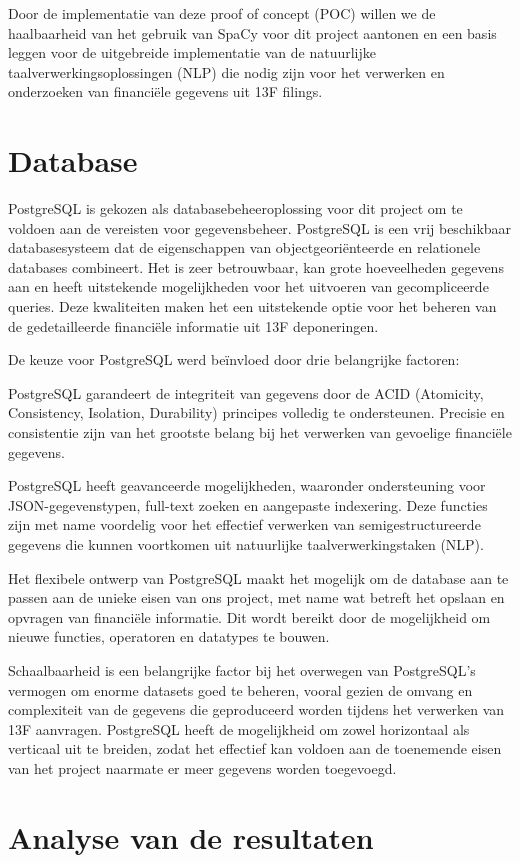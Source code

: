 Door de implementatie van deze proof of concept (POC) willen we de haalbaarheid van het gebruik van SpaCy voor dit project aantonen en een basis leggen voor de uitgebreide implementatie van de natuurlijke taalverwerkingsoplossingen (NLP) die nodig zijn voor het verwerken en onderzoeken van financiële gegevens uit 13F filings.

\section{Database}
PostgreSQL is gekozen als databasebeheeroplossing voor dit project om te voldoen aan de vereisten voor gegevensbeheer. PostgreSQL is een vrij beschikbaar databasesysteem dat de eigenschappen van objectgeoriënteerde en relationele databases combineert. Het is zeer betrouwbaar, kan grote hoeveelheden gegevens aan en heeft uitstekende mogelijkheden voor het uitvoeren van gecompliceerde queries. Deze kwaliteiten maken het een uitstekende optie voor het beheren van de gedetailleerde financiële informatie uit 13F deponeringen.

De keuze voor PostgreSQL werd beïnvloed door drie belangrijke factoren:

PostgreSQL garandeert de integriteit van gegevens door de ACID (Atomicity, Consistency, Isolation, Durability) principes volledig te ondersteunen. Precisie en consistentie zijn van het grootste belang bij het verwerken van gevoelige financiële gegevens.

PostgreSQL heeft geavanceerde mogelijkheden, waaronder ondersteuning voor JSON-gegevenstypen, full-text zoeken en aangepaste indexering. Deze functies zijn met name voordelig voor het effectief verwerken van semigestructureerde gegevens die kunnen voortkomen uit natuurlijke taalverwerkingstaken (NLP).

Het flexibele ontwerp van PostgreSQL maakt het mogelijk om de database aan te passen aan de unieke eisen van ons project, met name wat betreft het opslaan en opvragen van financiële informatie. Dit wordt bereikt door de mogelijkheid om nieuwe functies, operatoren en datatypes te bouwen.

Schaalbaarheid is een belangrijke factor bij het overwegen van PostgreSQL's vermogen om enorme datasets goed te beheren, vooral gezien de omvang en complexiteit van de gegevens die geproduceerd worden tijdens het verwerken van 13F aanvragen. PostgreSQL heeft de mogelijkheid om zowel horizontaal als verticaal uit te breiden, zodat het effectief kan voldoen aan de toenemende eisen van het project naarmate er meer gegevens worden toegevoegd.

\section{Analyse van de resultaten}
